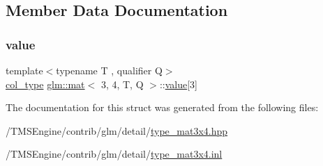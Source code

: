 \subsection{Member Data Documentation}
\mbox{\label{structglm_1_1mat_3_013_00_014_00_01_t_00_01_q_01_4_a5565dc4ee500797675a5841e79cf8d3c}} 
\subsubsection{\texorpdfstring{value}{value}}
{\footnotesize\ttfamily template$<$typename T , qualifier Q$>$ \\
\hyperlink{structglm_1_1mat_3_013_00_014_00_01_t_00_01_q_01_4_aaa23c4674cbe2dc1eda1d826b8ef721e}{col\+\_\+type} \hyperlink{structglm_1_1mat}{glm\+::mat}$<$ 3, 4, T, Q $>$\+::\hyperlink{_s_d_l__opengl__glext_8h_a8ad81492d410ff2ac11f754f4042150f}{value}\mbox{[}3\mbox{]}\hspace{0.3cm}{\ttfamily [private]}}



The documentation for this struct was generated from the following files\+:\begin{DoxyCompactItemize}
\item 
/\+T\+M\+S\+Engine/contrib/glm/detail/\hyperlink{type__mat3x4_8hpp}{type\+\_\+mat3x4.\+hpp}\item 
/\+T\+M\+S\+Engine/contrib/glm/detail/\hyperlink{type__mat3x4_8inl}{type\+\_\+mat3x4.\+inl}\end{DoxyCompactItemize}
